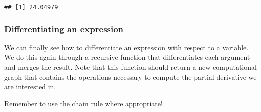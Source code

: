\documentclass[
  a4paper,
]{article}
\begin{document}
\begin{verbatim}
## [1] 24.04979
\end{verbatim}

\hypertarget{differentiating-an-expression}{%
\subsubsection{Differentiating an
expression}\label{differentiating-an-expression}}

We can finally see how to differentiate an expression with respect to a
variable. We do this again through a recursive function that
differentiates each argument and merges the result. Note that this
function should return a new computational graph that contains the
operations necessary to compute the partial derivative we are interested
in.

Remember to use the chain rule where appropriate!
\end{document}
